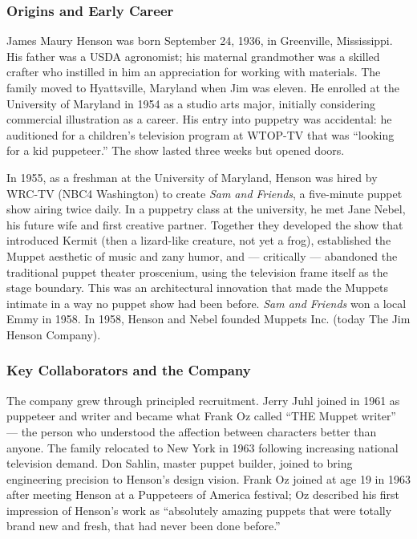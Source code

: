 \documentclass[11pt,letterpaper]{article}
\begin{document}
\subsubsection{Origins and Early Career}

James Maury Henson was born September 24, 1936, in Greenville, Mississippi. His father was a USDA agronomist; his maternal grandmother was a skilled crafter who instilled in him an appreciation for working with materials. The family moved to Hyattsville, Maryland when Jim was eleven. He enrolled at the University of Maryland in 1954 as a studio arts major, initially considering commercial illustration as a career. His entry into puppetry was accidental: he auditioned for a children's television program at WTOP-TV that was ``looking for a kid puppeteer.'' The show lasted three weeks but opened doors.

In 1955, as a freshman at the University of Maryland, Henson was hired by WRC-TV (NBC4 Washington) to create \textit{Sam and Friends}, a five-minute puppet show airing twice daily. In a puppetry class at the university, he met Jane Nebel, his future wife and first creative partner. Together they developed the show that introduced Kermit (then a lizard-like creature, not yet a frog), established the Muppet aesthetic of music and zany humor, and --- critically --- abandoned the traditional puppet theater proscenium, using the television frame itself as the stage boundary. This was an architectural innovation that made the Muppets intimate in a way no puppet show had been before. \textit{Sam and Friends} won a local Emmy in 1958. In 1958, Henson and Nebel founded Muppets Inc. (today The Jim Henson Company).

\subsubsection{Key Collaborators and the Company}

The company grew through principled recruitment. Jerry Juhl joined in 1961 as puppeteer and writer and became what Frank Oz called ``THE Muppet writer'' --- the person who understood the affection between characters better than anyone. The family relocated to New York in 1963 following increasing national television demand. Don Sahlin, master puppet builder, joined to bring engineering precision to Henson's design vision. Frank Oz joined at age 19 in 1963 after meeting Henson at a Puppeteers of America festival; Oz described his first impression of Henson's work as ``absolutely amazing puppets that were totally brand new and fresh, that had never been done before.''
\end{document}
